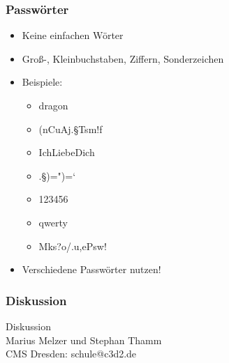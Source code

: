 \documentclass[12pt]{beamer}
\begin{document}
\begin{frame}
    \frametitle{Passwörter}
    \begin{itemize}
        \item<2-> Keine einfachen Wörter
        \item<3-> Groß-, Kleinbuchstaben, Ziffern, Sonderzeichen
        \item<4-> Beispiele:
            \begin{itemize}
                \item<5-> dragon
                \item<6-> (nCuAj.§Tsm!f
                \item<7-> IchLiebeDich
                \item<8-> .§)=")=`
                \item<9-> 123456
                \item<10-> qwerty
                \item<11-> Mks?o/.u,ePsw!
            \end{itemize}
        \item<12-> Verschiedene Passwörter nutzen!
    \end{itemize}
\end{frame}


\begin{frame}
    \frametitle{Diskussion}
    \begin{center} {\Large Diskussion}\\Marius Melzer und Stephan Thamm\\CMS Dresden: schule@c3d2.de \end{center}
\end{frame}
\end{document}
